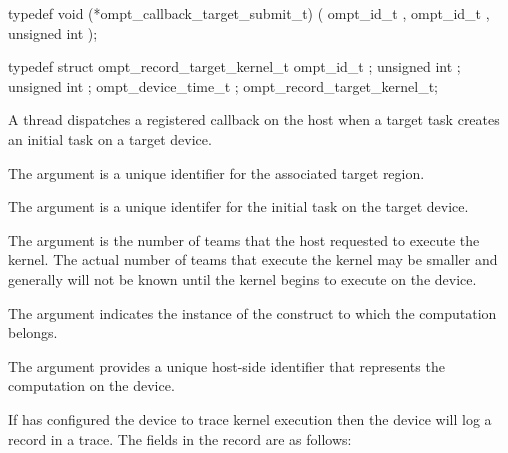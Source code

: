 \format
\begin{ccppspecific}
\begin{omptCallback}
typedef void (*ompt_callback_target_submit_t) (
  ompt_id_t ,
  ompt_id_t ,
  unsigned int 
);
\end{omptCallback}
\end{ccppspecific}

\record
\begin{ccppspecific}
\begin{omptRecord}
typedef struct ompt_record_target_kernel_t {
  ompt_id_t ;
  unsigned int ;
  unsigned int ;
  ompt_device_time_t ;
} ompt_record_target_kernel_t;
\end{omptRecord}
\end{ccppspecific}

\descr
A thread dispatches a registered  callback 
on the host when a target task creates an initial task on a target device.

\argdesc
The  argument is a unique identifier for the associated target region.

The  argument is a unique identifer for the initial task 
on the target device.

The  argument is the number of teams that the host 
requested to execute the kernel. The actual number of teams that execute the 
kernel may be smaller and generally will not be known until the kernel begins 
to execute on the device.

The  argument indicates the instance of the  construct 
to which the computation belongs.

The  argument provides a unique host-side identifier that 
represents the computation on the device.

If  has configured the device to trace kernel execution
then the device will log a  record in a trace. 
The fields in the record are as follows:

